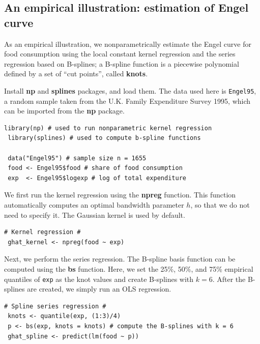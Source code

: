 \documentclass[10.5pt, A4paper, openany, uplatex]{book}
\numberwithin{equation}{section}
\begin{document}
\subsection{An empirical illustration: estimation of Engel curve}

As an empirical illustration, we nonparametrically estimate the Engel curve for food consumption using the local constant kernel regression and the series regression based on B-splines; a B-spline function is a piecewise polynomial defined by a set of ``cut points'', called \textbf{knots}.

Install \textbf{np} and \textbf{splines} packages, and load them.
The data used here is \texttt{Engel95}, a random sample taken from the U.K. Family Expenditure Survey 1995, which can be imported from the \textbf{np} package.

\begin{lstlisting}[basicstyle=\ttfamily\footnotesize, frame=single]
 library(np) # used to run nonparametric kernel regression
 library(splines) # used to compute b-spline functions

 data("Engel95") # sample size n = 1655
 food <- Engel95$food # share of food consumption
 exp  <- Engel95$logexp # log of total expenditure 
\end{lstlisting}

We first run the kernel regression using the \textbf{npreg} function.
This function automatically computes an optimal bandwidth parameter $h$, so that we do not need to specify it.
The Gaussian kernel is used by default.

\begin{lstlisting}[basicstyle=\ttfamily\footnotesize, frame=single]
# Kernel regression #
 ghat_kernel <- npreg(food ~ exp)
\end{lstlisting}

Next, we perform the series regression.
The B-spline basis function can be computed using the \textbf{bs} function.
Here, we set the 25\%, 50\%, and 75\% empirical quantiles of \texttt{exp} as the knot values and create B-splines with $k = 6$.
After the B-splines are created, we simply run an OLS regression.

\begin{lstlisting}[basicstyle=\ttfamily\footnotesize, frame=single]
# Spline series regression #
 knots <- quantile(exp, (1:3)/4)
 p <- bs(exp, knots = knots) # compute the B-splines with k = 6
 ghat_spline <- predict(lm(food ~ p))
\end{lstlisting}
\end{document}
